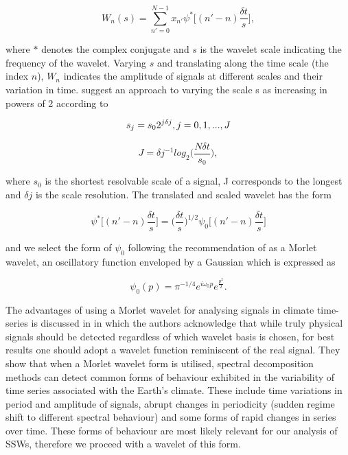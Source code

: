 \documentclass[wcd, manuscript]{copernicus}
\begin{document}
\begin{equation} \label{wavelet_transform}
W_n(s) = \sum^{N - 1}_{n' = 0} x_{n'} \psi^* \bigg[(n' - n) \frac{\delta t}{s}\bigg],
\end{equation}

where $*$ denotes the complex conjugate and $s$ is the wavelet scale indicating the frequency of the wavelet. Varying $s$ and translating along the time scale (the index $n$), $W_n$ indicates the amplitude of signals at different scales and their variation in time. \cite{Torrence1998} suggest an approach to varying the scale s as increasing in powers of 2 according to 

\begin{equation} \label{S}
s_j = s_0 2^{j \delta j},\\ j = 0, 1, ..., J
\end{equation}

\begin{equation} \label{S}
J = \delta j^{-1} log_2\bigg(\frac{N \delta t}{s_0}\bigg),
\end{equation}

where $s_0$ is the shortest resolvable scale of a signal, J corresponds to the longest and $\delta j$ is the scale resolution. The translated and scaled wavelet has the form

\begin{equation} \label{wavelet}
\psi^* \bigg[(n' - n) \frac{\delta t}{s}\bigg] = \bigg(\frac{\delta t}{s}\bigg)^{1/2} \psi_0\bigg[(n' - n) \frac{\delta t}{s}\bigg]
\end{equation}

and we select the form of $\psi_0$ following the recommendation of \cite{Torrence1998} as a Morlet wavelet, an oscillatory function enveloped by a Gaussian which is expressed as

\begin{equation} \label{psi0}
\psi_0(p) = \pi^{-1/4} e^{i\omega_0 p} e^{\frac{p^2}{2}}.
\end{equation}

The advantages of using a Morlet wavelet for analysing signals in climate time-series is discussed in \cite{Lau1995} in which the authors acknowledge that while truly physical signals should be detected regardless of which wavelet basis is chosen, for best results one should adopt a wavelet function reminiscent of the real signal. They show that when a Morlet wavelet form is utilised, spectral decomposition methods can detect common forms of behaviour exhibited in the variability of time series associated with the Earth's climate. These include time variations in period and amplitude of signals, abrupt changes in periodicity (sudden regime shift to different spectral behaviour) and some forms of rapid changes in series over time. These forms of behaviour are most likely relevant for our analysis of SSWs, therefore we proceed with a wavelet of this form. 
\end{document}
